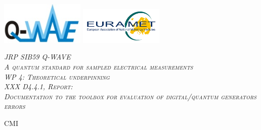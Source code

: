 \documentclass[12pt]{article} %
\begin{document}
\renewcommand\floatpagefraction{.9} \renewcommand\topfraction{.9} \renewcommand\bottomfraction{.9} \renewcommand\textfraction{.1} \setcounter{totalnumber}{50} \setcounter{topnumber}{50} \setcounter{bottomnumber}{50} %
\renewcommand{\labelitemi}{--}          %
\setlength{\unitlength}{1mm}            %

\thispagestyle{empty}
\begin{center}
\includegraphics[width=0.3\textwidth]{sources/qwlogo.jpg}
\hfill
\includegraphics[width=0.3\textwidth]{sources/eurametlogo.jpg}

        \vspace{5em}
        {\large \it 
        JRP SIB59 Q-WAVE\\
        \textsc{A quantum standard for sampled electrical measurements}\\

        \vspace{2em}
        WP 4: \textsc{Theoretical underpinning}\\

        \vfill
        \textsc{XXX} D4.4.1, \textsc{Report:}\\
        \textsc{Documentation to the toolbox for evaluation of digital/quantum generators errors}\\

        \bigskip
        {\Huge \color{red}{BETA version}}

        \vfill
        \textsc{CMI}\\

        \vfill
        }
\end{center}
\newpage
\end{document}
